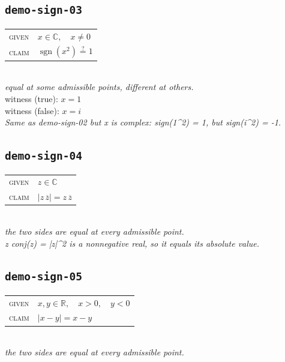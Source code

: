 \documentclass[11pt]{article}
\begin{document}
\subsection*{\texttt{demo-sign-03}}
\begin{tabular}{@{}l@{\quad}l@{}}
\textsc{given} & $x \in \mathbb{C},\quad x \neq 0$ \\[4pt]
\textsc{claim} & $\displaystyle \operatorname{sgn}\left(x^{2}\right) \overset{?}{=} 1$ \\
\end{tabular}\\[2pt]
{\small\emph{equal at some admissible points, different at others.}}\\
{\footnotesize\color{gray}witness (true): $x = 1$}\\
{\footnotesize\color{gray}witness (false): $x = i$}\\
\emph{Same as demo-sign-02 but x is complex: sign(1\textasciicircum{}2) = 1, but sign(i\textasciicircum{}2) = -1.}\\

\subsection*{\texttt{demo-sign-04}}
\begin{tabular}{@{}l@{\quad}l@{}}
\textsc{given} & $z \in \mathbb{C}$ \\[4pt]
\textsc{claim} & $\displaystyle \left|z \, \overline{z}\right| = z \, \overline{z}$ \\
\end{tabular}\\[2pt]
{\small\emph{the two sides are equal at every admissible point.}}\\
\emph{z conj(z) = |z|\textasciicircum{}2 is a nonnegative real, so it equals its absolute value.}\\

\subsection*{\texttt{demo-sign-05}}
\begin{tabular}{@{}l@{\quad}l@{}}
\textsc{given} & $x, y \in \mathbb{R},\quad x > 0,\quad y < 0$ \\[4pt]
\textsc{claim} & $\displaystyle \left|x - y\right| = x - y$ \\
\end{tabular}\\[2pt]
{\small\emph{the two sides are equal at every admissible point.}}\\
\end{document}
